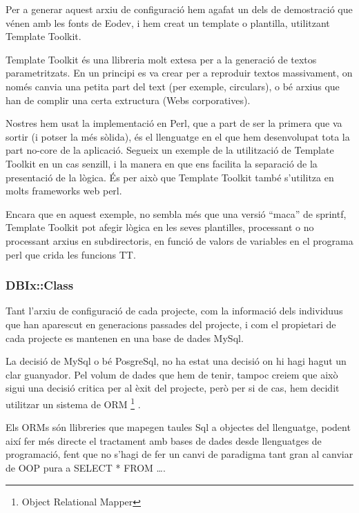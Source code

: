 \documentclass[titlepage,a4paper,12pt]{book}
\begin{document}
Per a generar aquest arxiu de configuració hem agafat un dels de demostració que
vénen amb les fonts de Eodev, i hem creat un template o plantilla, utilitzant
Template Toolkit.

Template Toolkit és una llibreria molt extesa per a la generació de textos
parametritzats.  En un principi es va crear per a reproduir textos massivament,
on només canvia una petita part del text (per exemple, circulars), o bé arxius
que han de complir una certa extructura (Webs corporatives).

Nostres hem usat la implementació en Perl, que a part de ser la primera que va
sortir (i potser la més sòlida), és el llenguatge en el que hem desenvolupat
tota la part no-core de la aplicació.  Segueix un exemple de la utilització de
Template Toolkit en un cas senzill, i la manera en que ens facilita la separació
de la presentació de la lògica.  És per això que Template Toolkit també
s'utilitza en molts frameworks web perl.


Encara que en aquest exemple, no sembla més que una versió ``maca'' de sprintf,
Template Toolkit pot afegir lògica en les seves plantilles, processant o no
processant arxius en subdirectoris, en funció de valors de variables en el
programa perl que crida les funcions TT.


\subsubsection{DBIx::Class} %
\label{ssub:DBIx Class}

Tant l'arxiu de configuració de cada projecte, com la informació dels individuus
que han aparescut en generacions passades del projecte, i com el propietari de
cada projecte es mantenen en una base de dades MySql.

La decisió de MySql o bé PosgreSql, no ha estat una decisió on hi hagi hagut un
clar guanyador.  Pel volum de dades que hem de tenir, tampoc creiem que això
sigui una decisió critica per al èxit del projecte, però per si de cas, hem
decidit utilitzar un sistema de ORM \footnote{Object Relational Mapper} .

Els ORMs són llibreries que mapegen taules Sql a objectes del llenguatge, podent
així fer més directe el tractament amb bases de dades desde llenguatges de
programació, fent que no s'hagi de fer un canvi de paradigma tant gran al
canviar de OOP pura a SELECT * FROM \ldots  .
\end{document}
